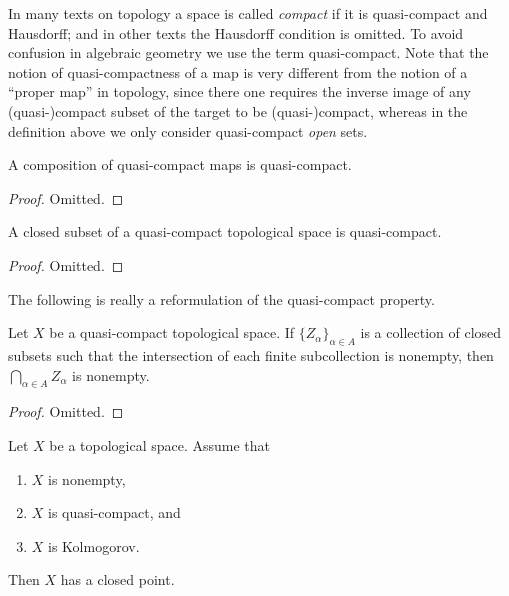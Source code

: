 \noindent
In many texts on topology a space is called {\it compact} if it
is quasi-compact and Hausdorff; and in other texts the Hausdorff
condition is omitted. To avoid confusion in algebraic geometry
we use the term quasi-compact. Note that the notion of quasi-compactness
of a map is very different from the notion of a ``proper map''
in topology, since there one requires the inverse image of any
(quasi-)compact subset of the target to be (quasi-)compact,
whereas in the definition above we only consider quasi-compact
{\it open} sets.

\begin{lemma}
\label{lemma-composition-quasi-compact}
A composition of quasi-compact maps is quasi-compact.
\end{lemma}

\begin{proof}
Omitted.
\end{proof}

\begin{lemma}
\label{lemma-closed-in-quasi-compact}
A closed subset of a quasi-compact topological space
is quasi-compact.
\end{lemma}

\begin{proof}
Omitted.
\end{proof}

\noindent
The following is really a reformulation of the
quasi-compact property.

\begin{lemma}
\label{lemma-intersection-closed-in-quasi-compact}
Let $X$ be a quasi-compact topological space.
If $\{Z_\alpha\}_{\alpha \in A}$ is a collection of closed subsets
such that the intersection of each finite subcollection
is nonempty, then $\bigcap_{\alpha \in A} Z_\alpha$ is nonempty.
\end{lemma}

\begin{proof}
Omitted.
\end{proof}

\begin{lemma}
\label{lemma-quasi-compact-closed-point}
Let $X$ be a topological space. Assume that
\begin{enumerate}
\item $X$ is nonempty,
\item $X$ is quasi-compact, and
\item $X$ is Kolmogorov.
\end{enumerate}
Then $X$ has a closed point.
\end{lemma}

